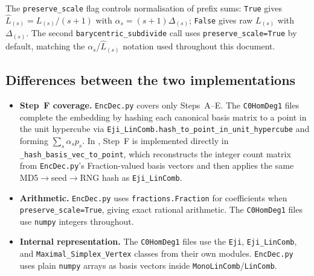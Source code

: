 \documentclass[11pt,a4paper]{article}
\newcommand{\encdecpy}{\texttt{EncDec.py}}
\begin{document}
\noindent
The \texttt{preserve\_scale} flag controls normalisation of prefix sums:
\texttt{True} gives $\hat{L}_{(s)} = L_{(s)}/(s{+}1)$ with
$\alpha_s = (s{+}1)\Delta_{(s)}$; \texttt{False} gives raw $L_{(s)}$ with
$\Delta_{(s)}$.  The second \texttt{barycentric\_subdivide} call uses
\texttt{preserve\_scale=True} by default, matching the $\alpha_s$/$\hat{L}_{(s)}$
notation used throughout this document.

\subsection*{Differences between the two implementations}

\begin{sloppypar}
\begin{itemize}[nosep]
\item \textbf{Step~F coverage.}  \encdecpy{} covers only Steps~A--E.
  The \texttt{C0HomDeg1} files complete the embedding by hashing each canonical
  basis matrix to a point in the unit hypercube via
  \texttt{Eji\_LinComb.}\allowbreak\texttt{hash\_to\_point\_in\_unit\_hypercube}
  and forming $\sum_s \alpha_s p_s$.  In \algtwobpy{}, Step~F is implemented
  directly in \texttt{\_hash\_basis\_vec\_to\_point}, which reconstructs the
  integer count matrix from \encdecpy{}'s Fraction-valued basis vectors and then
  applies the same MD5$\to$seed$\to$RNG hash as \texttt{Eji\_LinComb}.

\item \textbf{Arithmetic.}  \encdecpy{} uses \texttt{fractions.Fraction} for
  coefficients when \texttt{preserve\_scale=True}, giving exact rational
  arithmetic.  The \texttt{C0HomDeg1} files use \texttt{numpy} integers
  throughout.

\item \textbf{Internal representation.}  The \texttt{C0HomDeg1} files use the
  \texttt{Eji}, \texttt{Eji\_LinComb}, and \texttt{Maximal\_Simplex\_Vertex}
  classes from their own modules.  \encdecpy{} uses plain \texttt{numpy} arrays
  as basis vectors inside \texttt{MonoLinComb}/\texttt{LinComb}.
\end{itemize}
\end{sloppypar}
\end{document}
